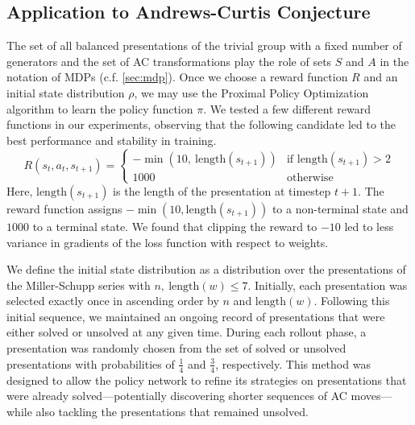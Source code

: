 \subsection{Application to Andrews-Curtis Conjecture} \label{sec:application}

The set of all balanced presentations of the trivial group with a fixed number of generators and the set of AC transformations play the role of sets $S$ and $A$ in the notation of MDPs (c.f. \autoref{sec:mdp}). Once we choose a reward function $R$ and an initial state distribution $\rho$, we may use the Proximal Policy Optimization algorithm to learn the policy function $\pi$. We tested a few different reward functions in our experiments, observing that the following candidate led to the best performance and stability in training.
\[
R(s_{t}, a_{t}, s_{t+1}) = 
\begin{cases} 
-\min(10, \ \text{length}(s_{t+1})) & \text{if length}(s_{t+1}) > 2 \\
1000 & \text{otherwise } 
\end{cases}
\]
Here, $\text{length}(s_{t+1})$ is the length of the presentation at timestep $t+1$. The reward function assigns $-\min(10, \text{length}(s_{t+1}))$ to a non-terminal state and $1000$ to a terminal state. We found that clipping the reward to $-10$ led to less variance in gradients of the loss function with respect to weights.
\newline

We define the initial state distribution as a distribution over the presentations of the Miller-Schupp series with $n, \ \text{length}(w) \leq 7$. Initially, each presentation was selected exactly once in ascending order by $n$ and $\text{length}(w)$. Following this initial sequence, we maintained an ongoing record of presentations that were either solved or unsolved at any given time. During each rollout phase, a presentation was randomly chosen from the set of solved or unsolved presentations with probabilities of  $\frac{1}{4}$ and $\frac{3}{4}$, respectively. This method was designed to allow the policy network to refine its strategies on presentations that were already solved—potentially discovering shorter sequences of AC moves—while also tackling the presentations that remained unsolved.
\newline

